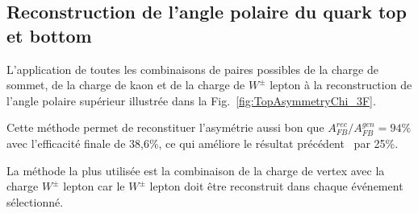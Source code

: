 \newpage
\subsection*{Reconstruction de l'angle polaire du quark top et bottom}

L'application de toutes les combinaisons de paires possibles de la charge de sommet, de la charge de kaon et de la charge de $W^\pm$ lepton à la reconstruction de l'angle polaire supérieur illustrée dans la Fig.~\ref {fig:TopAsymmetryChi_3F}.

Cette méthode permet de reconstituer l'asymétrie aussi bon que $A_ {FB}^{rec} / A^{gen}_{FB} = 94\%$ avec l'efficacité finale de 38,6\%, ce qui améliore le résultat précédent~\cite {bib:ILCTOP} par 25\%.

La méthode la plus utilisée est la combinaison de la charge de vertex avec la charge $W^\pm$ lepton car le $ W^\pm$ lepton doit être reconstruit dans chaque événement sélectionné.

